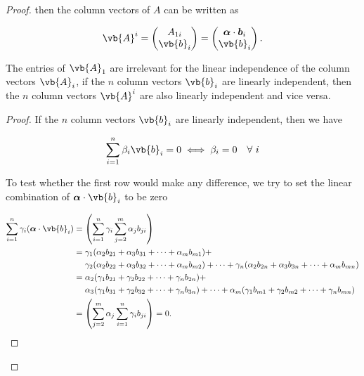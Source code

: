 \documentclass[a4paper,12pt]{report}
\begin{document}
\begin{appendices}
\begin{proof}
    then the column vectors of \(A\) can be written as 
    
    \begin{equation}
        \vb{A} ^{i} = \begin{pmatrix}
             A_{1i}  \\
            \vb{b} _{i}   \\
        \end{pmatrix} = \begin{pmatrix}
             \boldsymbol{\alpha } \cdot \boldsymbol{b}_{i}    \\
             \vb{b} _{i}  \\
        \end{pmatrix}.
    \end{equation}

    \begin{lemma}
    The entries of \(\vb{A} _{1} \) are irrelevant for the linear independence of the column vectors \(\vb{A} _{i} \), \ie if the \(n\) column vectors \(\vb{b} _{i} \) are linearly independent, then the \(n\) column vectors \(\vb{A} ^{i} \) are also linearly independent and vice versa.   
    \end{lemma}
    
    \begin{proof}
        If the \(n\) column vectors \(\vb{b} _{i} \) are linearly independent, then we have
        
        \begin{equation}
        \sum_{i=1}^{n} \beta _{i}\vb{b} _{i} = 0 \iff \beta _{i} = 0 ~~~\forall~ i
        \end{equation}
        
        To test whether the first row would make any difference, we try to set the linear combination of \(\boldsymbol{\alpha }\cdot \vb{b} _{i}  \) to be zero
    
        \begin{equation}
            \begin{aligned}
            \sum_{i=1}^{n} \gamma _{i} (\boldsymbol{\alpha }\cdot \vb{b} _{i}) &= \left( \sum_{i=1}^{n} \gamma _{i} \sum_{j=2}^{m}\alpha _{j}b_{ji} \right) \\
            &= \gamma _{1}(\alpha _{2}b_{21} + \alpha _{3}b_{31} + \cdots + \alpha _{m} b_{m1}) +\\ &~~~~\gamma _{2} (\alpha _{2}b_{22} + \alpha _{3}b_{32} + \cdots + \alpha _{m} b_{m2 }) + \cdots + \gamma _{n} (\alpha _{2}b_{2n} + \alpha _{3}b_{3n} + \cdots + \alpha _{m} b_{mn}) \\ 
            &= \alpha _{2}(\gamma _{1} b_{21} + \gamma _{2} b_{22} + \cdots + \gamma _{n} b_{2n} ) +\\ &~~~~ \alpha _{3} (\gamma _{1} b_{31} + \gamma _{2} b_{32} + \cdots + \gamma _{n} b_{3n}  )  + \cdots + \alpha _{m}(\gamma _{1} b_{m1} + \gamma _{2} b_{m2} + \cdots + \gamma _{n} b_{mn} ) \\
            &= \left( \sum_{j=2}^{m} \alpha _{j}  \sum_{i=1}^{n} \gamma _{i} b_{ji} \right)  = 0.
            \end{aligned}
    \end{equation}
    

\end{proof}
\end{proof}
\end{appendices}
\end{document}
